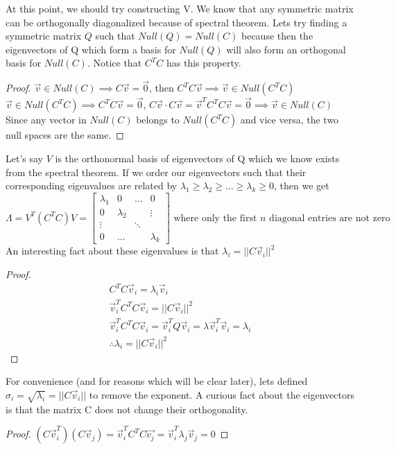 \documentclass{article}
\newtheorem{proof}{Proof}
\begin{document}
At this point, we should try constructing V. We know that any symmetric matrix can be orthogonally diagonalized because of spectral theorem.
Lets try finding a symmetric matrix $Q$ such that $Null(Q)=Null(C)$ because then the eigenvectors of Q which form a basis for $Null(Q)$ will also form an orthogonal basis for $Null(C)$. Notice that $C^TC$ has this property.
\begin{proof}
    $\vec{v}\in Null(C) \implies C\vec{v}=\vec{0}$, then $C^TC\vec{v} \implies \vec{v} \in Null(C^TC)$
    $\vec{v} \in Null(C^TC) \implies C^TC\vec{v}=\vec{0}$, $C\vec{v} \cdot C\vec{v}=\vec{v}^TC^TC\vec{v}=\vec{0}\implies \vec{v}\in Null(C)$
    Since any vector in $Null(C)$ belongs to $Null(C^TC)$ and vice versa, the two null spaces are the same.
\end{proof}
Let's say $V$ is the orthonormal basis of eigenvectors of Q which we know exists from the spectral theorem.
If we order our eigenvectors such that their corresponding eigenvalues are related by $\lambda_1 \ge \lambda_2 \ge ... \ge \lambda_k \ge 0$,
then we get
\[
    \Lambda = V^T(C^TC)V=\left[
        \begin{array}{cccc}
            \lambda_1 & 0 & ... & 0\\
            0 & \lambda _2 & & \vdots\\
            \vdots & & \ddots & \\
            0 & ... & & \lambda_k
        \end{array}
    \right]
    \text{ where only the first } n \text{ diagonal entries are not zero}
\]
An interesting fact about these eigenvalues is that $\lambda_i = ||C\vec{v}_i||^2$
\begin{proof}
    \[
        \begin{array}{c}
            C^TC\vec{v}_i = \lambda_i \vec{v}_i\\
            \vec{v}_i^TC^TC\vec{v}_i = ||C\vec{v}_i||^2 \\
            \vec{v}_i^TC^TC\vec{v}_i = \vec{v}_i^TQ\vec{v}_i = \lambda \vec{v}_i^T\vec{v}_i = \lambda_i\\
            \therefore \lambda_i = ||C\vec{v}_i||^2
        \end{array}
    \]
\end{proof}
For convenience (and for reasons which will be clear later), lets defined $\sigma_i=\sqrt{\lambda_i} = ||C\vec{v}_i||$ to remove the exponent.
A curious fact about the eigenvectors is that the matrix C does not change their orthogonality.
\begin{proof}
    $(C\vec{v}_i^T)(C\vec{v}_j)=\vec{v}_i^TC^TC\vec{v_j}=\vec{v}_i^T\lambda_j \vec{v}_j = 0$
\end{proof}
\end{document}
